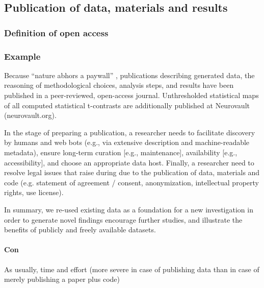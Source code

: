 \pagebreak



\subsection{Publication of data, materials and results}


\subsubsection{Definition of open access}


\subsubsection{Example}

Because ``nature abhors a paywall'' \citep{dupre2020nature}, publications
describing generated data, the reasoning of methodological choices, analysis
steps, and results \citep{haeusler2021speechanno, haeusler2022processing} have
been published in a peer-reviewed, open-access journal.
%
Unthresholded statistical maps of all computed statistical t-contrasts are
additionally published at Neurovault (neurovault.org).


In the stage of preparing a publication, a researcher needs to facilitate
discovery by humans and web bots (e.g., via extensive description and
machine-readable metadata), ensure long-term curation [e.g., maintenance],
availability [e.g., accessibility], and choose an appropriate data host.
Finally, a researcher need to resolve legal issues that raise during due to the
publication of data, materials and code (e.g. statement of agreement / consent,
anonymization, intellectual property rights, use license).

In summary, we re-used existing data as a foundation for a new investigation in
order to generate novel findings encourage further studies, and illustrate the
benefits of publicly and freely available datasets.


\paragraph{Con}

As usually, time and effort (more severe in case of publishing data than in case
of merely publishing a paper plus code)


